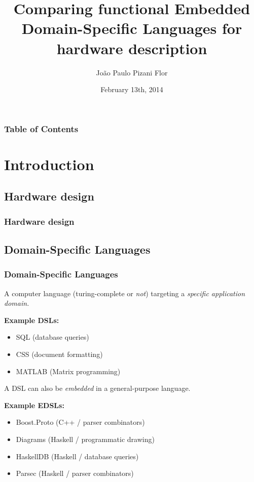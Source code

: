 \documentclass{beamer}
\title[Comparing functional EDSLs for hardware description]{Comparing functional Embedded Domain-Specific Languages for hardware description}
\date{February 13th, 2014}
\author[Pizani Flor]
{
    João Paulo Pizani Flor
}
\institute[Utrecht University]
{
    Department of Information and Computing Sciences,
    Utrecht University
}
\begin{document}
    \begin{frame}
        \titlepage
    \end{frame}

    \begin{frame}
        \frametitle{Table of Contents}
        \tableofcontents
    \end{frame}



    \section{Introduction}
    \label{sec:introduction}
        \frame{\sectionpage}

        \subsection{Hardware design}
        \label{subsec:hardware-design}
            \begin{frame}
                \frametitle{Hardware design}
            \end{frame}

        \subsection{Domain-Specific Languages}
        \label{subsec:domain-specific-languages}
            \begin{frame}
                \frametitle{Domain-Specific Languages}

                \par{A computer language (turing-complete or \emph{not}) targeting a \emph{specific application domain.}}
                \par{\textbf{Example DSLs:}}
                \begin{itemize}
                    \item SQL (database queries)
                    \item CSS (document formatting)
                    \item MATLAB (Matrix programming)
                \end{itemize}

                \pause

                \par{A DSL can also be \emph{embedded} in a general-purpose language.}
                \par{\textbf{Example EDSLs:}}
                \begin{itemize}
                    \item Boost.Proto (C++ / parser combinators)
                    \item Diagrams (Haskell / programmatic drawing)
                    \item HaskellDB (Haskell / database queries)
                    \item Parsec (Haskell / parser combinators)
                \end{itemize}
            \end{frame}
\end{document}
